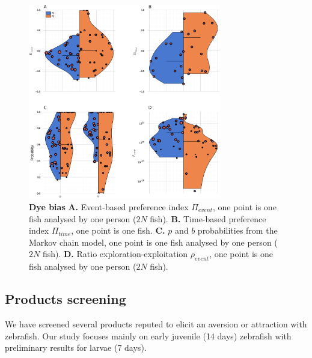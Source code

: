     \begin{figure}[htb]
      \centering
      \includegraphics[width=0.75\textwidth]{part_2/assets/dye_pi.png}
      \caption{\textbf{Dye bias} \textbf{A.} Event-based preference index $\Pi_{event}$, one point is one fish analysed by one person ($2N$ fish). \textbf{B.} Time-based preference index $\Pi_{time}$, one point is one fish. \textbf{C.} $p$ and $b$ probabilities from the Markov chain model, one point is one fish analysed by one person ($2N$ fish). \textbf{D.} Ratio exploration-exploitation $\rho_{event}$, one point is one fish analysed by one person ($2N$ fish).}
      \label{dye_bias}
    \end{figure}

  \subsection{Products screening}
  We have screened several products reputed to elicit an aversion or attraction with zebrafish. Our study focuses mainly on early juvenile (14 days) zebrafish with preliminary results for larvae (7 days).

